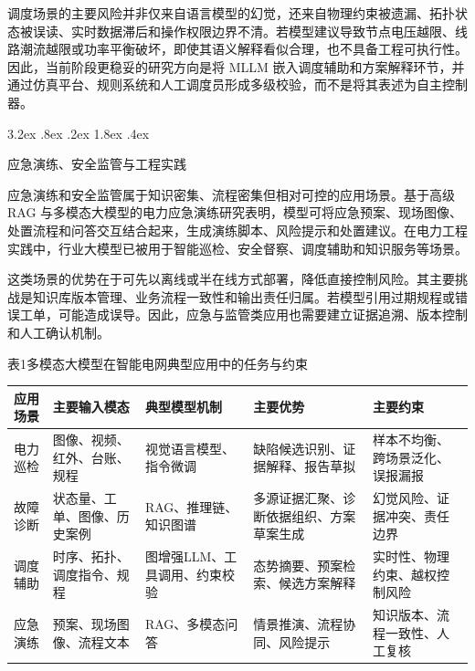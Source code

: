 \documentclass[10.5pt,compsoc]{CjC}
\makeatletter
\renewcommand\subsection{\@startsection{subsection}{2}{\z@}%
  {3.2ex \@plus .8ex \@minus .2ex}%
  {1.8ex \@plus .4ex}%
  {\normalfont\zihao{5}\heiti\bfseries\raggedright}}
\theoremstyle{mystyle}
\makeatother
\begin{document}
调度场景的主要风险并非仅来自语言模型的幻觉，还来自物理约束被遗漏、拓扑状态被误读、实时数据滞后和操作权限边界不清。若模型建议导致节点电压越限、线路潮流越限或功率平衡破坏，即使其语义解释看似合理，也不具备工程可执行性。因此，当前阶段更稳妥的研究方向是将 MLLM 嵌入调度辅助和方案解释环节，并通过仿真平台、规则系统和人工调度员形成多级校验，而不是将其表述为自主控制器。


\subsection{应急演练、安全监管与工程实践}

应急演练和安全监管属于知识密集、流程密集但相对可控的应用场景。基于高级 RAG 与多模态大模型的电力应急演练研究表明，模型可将应急预案、现场图像、处置流程和问答交互结合起来，生成演练脚本、风险提示和处置建议\cite{liwenchao2025rag}。在电力工程实践中，行业大模型已被用于智能巡检、安全督察、调度辅助和知识服务等场景\cite{ghafari2025comprehensive,li2024foundation_power}。

这类场景的优势在于可先以离线或半在线方式部署，降低直接控制风险。其主要挑战是知识库版本管理、业务流程一致性和输出责任归属。若模型引用过期规程或错误工单，可能造成误导。因此，应急与监管类应用也需要建立证据追溯、版本控制和人工确认机制。

\begin{table}[htbp]
\centering
\heiti 表1\quad 多模态大模型在智能电网典型应用中的任务与约束
\vspace{-2mm}
\begin{tabular}{p{22mm}p{31mm}p{32mm}p{36mm}p{33mm}}
\toprule
应用场景 & 主要输入模态 & 典型模型机制 & 主要优势 & 主要约束 \\
\midrule
电力巡检 & 图像、视频、红外、台账、规程 & 视觉语言模型、指令微调 & 缺陷候选识别、证据解释、报告草拟 & 样本不均衡、跨场景泛化、误报漏报 \\
故障诊断 & 状态量、工单、图像、历史案例 & RAG、推理链、知识图谱 & 多源证据汇聚、诊断依据组织、方案草案生成 & 幻觉风险、证据冲突、责任边界 \\
调度辅助 & 时序、拓扑、调度指令、规程 & 图增强LLM、工具调用、约束校验 & 态势摘要、预案检索、候选方案解释 & 实时性、物理约束、越权控制风险 \\
应急演练 & 预案、现场图像、流程文本 & RAG、多模态问答 & 情景推演、流程协同、风险提示 & 知识版本、流程一致性、人工复核 \\
\bottomrule
\end{tabular}
\label{tab:applications}
\end{table}
\end{document}
